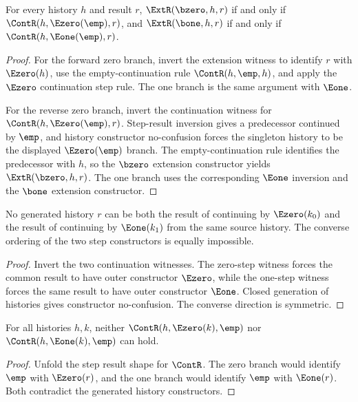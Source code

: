 \begin{theorem}
\label{thm:extension-as-one-step-continuation}
For every history $h$ and result $r$, $\ExtR(\bzero,h,r)$ if and only if
$\ContR(h,\Ezero(\emp),r)$, and $\ExtR(\bone,h,r)$ if and only if
$\ContR(h,\Eone(\emp),r)$.
\end{theorem}
\begin{proof}
For the forward zero branch, invert the extension witness to identify
$r$ with $\Ezero(h)$, use the empty-continuation rule
$\ContR(h,\emp,h)$, and apply the $\Ezero$ continuation step rule. The one
branch is the same argument with $\Eone$.

For the reverse zero branch, invert the continuation witness for
$\ContR(h,\Ezero(\emp),r)$. Step-result inversion gives a predecessor
continued by $\emp$, and history constructor no-confusion forces the
singleton history to be the displayed $\Ezero(\emp)$ branch. The
empty-continuation rule identifies the predecessor with $h$, so the
$\bzero$ extension constructor yields $\ExtR(\bzero,h,r)$. The one branch
uses the corresponding $\Eone$ inversion and the $\bone$ extension
constructor.
\end{proof}

\begin{theorem}
\label{thm:cont-step-result-no-confusion-pair}
No generated history \(r\) can be both the result of continuing by
\(\Ezero(k_0)\) and the result of continuing by \(\Eone(k_1)\) from the same
source history. The converse ordering of the two step constructors is equally
impossible.
\end{theorem}
\begin{proof}
Invert the two continuation witnesses. The zero-step witness forces the common
result to have outer constructor \(\Ezero\), while the one-step witness forces
the same result to have outer constructor \(\Eone\). Closed generation of
histories gives constructor no-confusion. The converse direction is symmetric.
\end{proof}

\begin{theorem}
\label{thm:continuation-step-result-not-empty}
For all histories $h,k$, neither $\ContR(h,\Ezero(k),\emp)$ nor
$\ContR(h,\Eone(k),\emp)$ can hold.
\end{theorem}
\begin{proof}
Unfold the step result shape for $\ContR$. The zero branch would identify $\emp$ with
$\Ezero(r)$, and the one branch would identify $\emp$ with $\Eone(r)$. Both contradict the
generated history constructors.
\end{proof}


